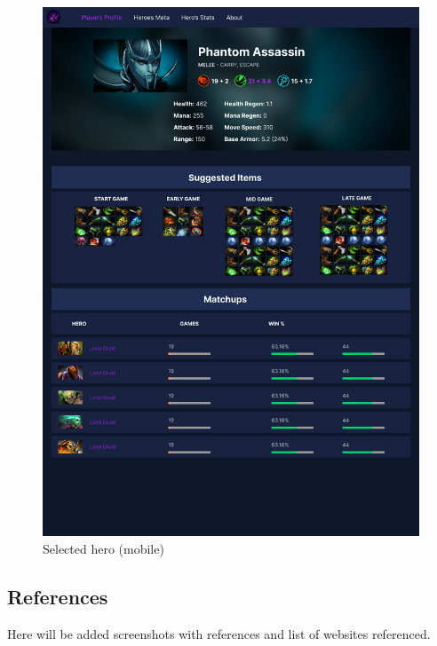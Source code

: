 \begin{figure}[ht]
\begin{minipage}[t]{0.48\textwidth}
            \centering
            \includegraphics[width=\textwidth]{images/SelectedHero_m}
            \caption{Selected hero (mobile)}
        \end{minipage}
    \end{figure}



\subsection{References}

Here will be added screenshots with references and list of websites referenced.


